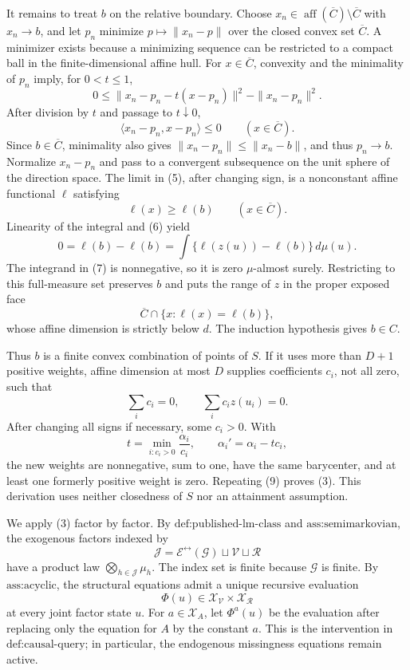It remains to treat \(b\) on the relative boundary. Choose \(x_n\in\operatorname{aff}(\overline C)\setminus\overline C\) with \(x_n\to b\), and let \(p_n\) minimize \(p\mapsto\|x_n-p\|\) over the closed convex set \(\overline C\). A minimizer exists because a minimizing sequence can be restricted to a compact ball in the finite-dimensional affine hull. For \(x\in\overline C\), convexity and the minimality of \(p_n\) imply, for \(0<t\leq1\),
\[
0\leq
\|x_n-p_n-t(x-p_n)\|^2-\|x_n-p_n\|^2.
\]
After division by \(t\) and passage to \(t\downarrow0\),
\[
\langle x_n-p_n,x-p_n\rangle\leq0
\qquad(x\in\overline C).
\tag{5}
\]
Since \(b\in\overline C\), minimality also gives \(\|x_n-p_n\|\leq\|x_n-b\|\), and thus \(p_n\to b\). Normalize \(x_n-p_n\) and pass to a convergent subsequence on the unit sphere of the direction space. The limit in (5), after changing sign, is a nonconstant affine functional \(\ell\) satisfying
\[
\ell(x)\geq\ell(b)
\qquad(x\in\overline C).
\tag{6}
\]
Linearity of the integral and (6) yield
\[
0=\ell(b)-\ell(b)
=\int\{\ell(z(u))-\ell(b)\}\,d\mu(u).
\tag{7}
\]
The integrand in (7) is nonnegative, so it is zero \(\mu\)-almost surely. Restricting to this full-measure set preserves \(b\) and puts the range of \(z\) in the proper exposed face
\[
\overline C\cap\{x:\ell(x)=\ell(b)\},
\]
whose affine dimension is strictly below \(d\). The induction hypothesis gives \(b\in C\).

Thus \(b\) is a finite convex combination of points of \(S\). If it uses more than \(D+1\) positive weights, affine dimension at most \(D\) supplies coefficients \(c_i\), not all zero, such that
\[
\sum_i c_i=0,
\qquad
\sum_i c_i z(u_i)=0.
\tag{8}
\]
After changing all signs if necessary, some \(c_i>0\). With
\[
t=\min_{i:c_i>0}\frac{\alpha_i}{c_i},
\qquad
\alpha_i'=\alpha_i-tc_i,
\tag{9}
\]
the new weights are nonnegative, sum to one, have the same barycenter, and at least one formerly positive weight is zero. Repeating (9) proves (3). This derivation uses neither closedness of \(S\) nor an attainment assumption.

We apply (3) factor by factor. By \(\text{def:published-lm-class}\) and \(\text{ass:semimarkovian}\), the exogenous factors indexed by
\[
\mathcal J=\mathcal E^{\leftrightarrow}(\mathcal G)\sqcup\mathcal V\sqcup\mathcal R
\]
have a product law \(\bigotimes_{h\in\mathcal J}\mu_h\). The index set is finite because \(\mathcal G\) is finite. By \(\text{ass:acyclic}\), the structural equations admit a unique recursive evaluation
\[
\Phi(u)\in\mathcal X_{\mathcal V}\times\mathcal X_{\mathcal R}
\]
at every joint factor state \(u\). For \(a\in\mathcal X_A\), let \(\Phi^a(u)\) be the evaluation after replacing only the equation for \(A\) by the constant \(a\). This is the intervention in \(\text{def:causal-query}\); in particular, the endogenous missingness equations remain active.

